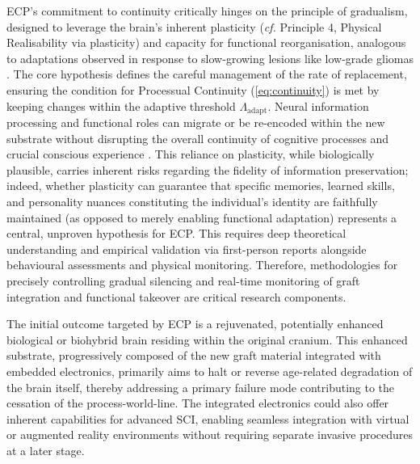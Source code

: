 \documentclass[10pt]{article}
\begin{document}
\begin{sloppypar}
  ECP’s commitment to continuity critically hinges on the principle of gradualism, designed to leverage the brain’s inherent plasticity (\textit{cf.} Principle 4, Physical Realisability via plasticity) and capacity for functional reorganisation, analogous to adaptations observed in response to slow-growing lesions like low-grade gliomas \citep{desmurget_contrasting_2007,duffau_huge_2014}. The core hypothesis defines the careful management of the rate of replacement, ensuring the condition for Processual Continuity (\autoref{eq:continuity}) is met by keeping changes within the adaptive threshold \( \Lambda_{\text{adapt}} \). Neural information processing and functional roles can migrate or be re-encoded within the new substrate without disrupting the overall continuity of cognitive processes and crucial conscious experience \citep{hebert_lab_research_2025,hebert_could_2022,jin_integration_2023}. This reliance on plasticity, while biologically plausible, carries inherent risks regarding the fidelity of information preservation; indeed, whether plasticity can guarantee that specific memories, learned skills, and personality nuances constituting the individual’s identity are faithfully maintained (as opposed to merely enabling functional adaptation) represents a central, unproven hypothesis for ECP. This requires deep theoretical understanding and empirical validation via first-person reports alongside behavioural assessments and physical monitoring. Therefore, methodologies for precisely controlling gradual silencing and real-time monitoring of graft integration and functional takeover are critical research components.

  The initial outcome targeted by ECP is a rejuvenated, potentially enhanced biological or biohybrid brain residing within the original cranium. This enhanced substrate, progressively composed of the new graft material integrated with embedded electronics, primarily aims to halt or reverse age-related degradation of the brain itself, thereby addressing a primary failure mode contributing to the cessation of the process-world-line. The integrated electronics could also offer inherent capabilities for advanced SCI, enabling seamless integration with virtual or augmented reality environments without requiring separate invasive procedures at a later stage.


\end{sloppypar}
\end{document}
